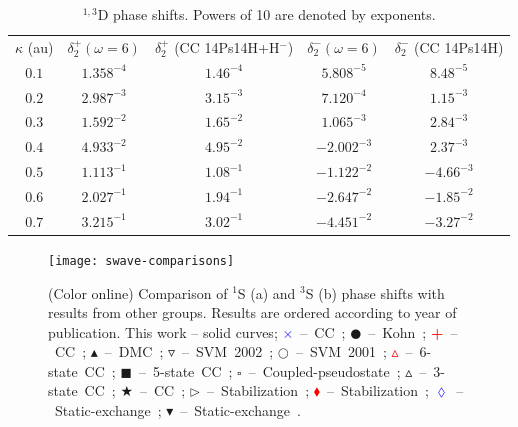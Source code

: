 \documentclass[preprint,showpacs,preprintnumbers,amsmath,amssymb,longbibliography,pra,aps]{revtex4-1}
\begin{document}
\begin{table}
\begin{center}
\begin{ruledtabular}
\begin{tabular}{c c c c c}
$\kappa$ (au) & $\delta_2^+ (\omega = 6)$ & $\delta_2^+$ (CC 14Ps14H+H$^-$) \cite{Walters2004} & $\delta_2^- (\omega = 6)$ & $\delta_2^-$ (CC 14Ps14H) \cite{Blackwood2002} \\
\colrule
$0.1$ & $1.358^{-4}$ & $1.46^{-4}$ & $5.808^{-5}$ & $8.48^{-5}$ \\
$0.2$ & $2.987^{-3}$ & $3.15^{-3}$ & $7.120^{-4}$ & $1.15^{-3}$ \\
$0.3$ & $1.592^{-2}$ & $1.65^{-2}$ & $1.065^{-3}$ & $2.84^{-3}$ \\
$0.4$ & $4.933^{-2}$ & $4.95^{-2}$ & $-2.002^{-3}$ & $2.37^{-3}$ \\
$0.5$ & $1.113^{-1}$ & $1.08^{-1}$ & $-1.122^{-2}$ & $-4.66^{-3}$ \\
$0.6$ & $2.027^{-1}$ & $1.94^{-1}$ & $-2.647^{-2}$ & $-1.85^{-2}$ \\
$0.7$ & $3.215^{-1}$ & $3.02^{-1}$ & $-4.451^{-2}$ & $-3.27^{-2}$ \\
\end{tabular}
\end{ruledtabular}
\caption{$^{1,3}$D phase shifts. Powers of 10 are denoted by exponents.}
\label{tab:DWavePhase}
\end{center}
\end{table}



\begin{figure}[H]
	\centering
	\texttt{[image: swave-comparisons]}
	\caption{(Color online) Comparison of $^1$S (a) and $^3$S (b) phase shifts with results from other groups. Results are ordered according to year of publication. This work -- solid curves; \mbox{\textcolor{blue}{$\times$} -- CC \cite{Walters2004};} \mbox{$\CIRCLE$ -- Kohn \cite{VanReeth2003};} \mbox{\textcolor{red}{\textbf{+}} -- CC \cite{Blackwood2002};} \mbox{$\blacktriangle$ -- DMC \cite{Chiesa2002};} \mbox{$\triangledown$ -- SVM 2002 \cite{Ivanov2002};} \mbox{$\Circle$ -- SVM 2001 \cite{Ivanov2001};} \mbox{\textcolor{red}{$\vartriangle$} -- 6-state CC \cite{Sinha2000};} \mbox{$\blacksquare$ -- 5-state CC \cite{Adhikari1999};} \mbox{$\square$ -- Coupled-pseudostate \cite{Campbell1998};} \mbox{$\vartriangle$ -- 3-state CC \cite{Sinha1997};} \mbox{\textcolor[RGB]{0,127,0}{$\bigstar$} -- CC \cite{Ray1997};} \mbox{$\triangleright$ -- Stabilization \cite{Drachman1976};} \mbox{\textcolor{red}{$\blacklozenge$} -- Stabilization \cite{Drachman1975};} \mbox{\textcolor{blue}{$\lozenge$} -- Static-exchange \cite{Hara1975};} \mbox{$\blacktriangledown$ -- Static-exchange \cite{Fraser1961}.}}
	\label{fig:swave-comparisons}
\end{figure}
\end{document}
